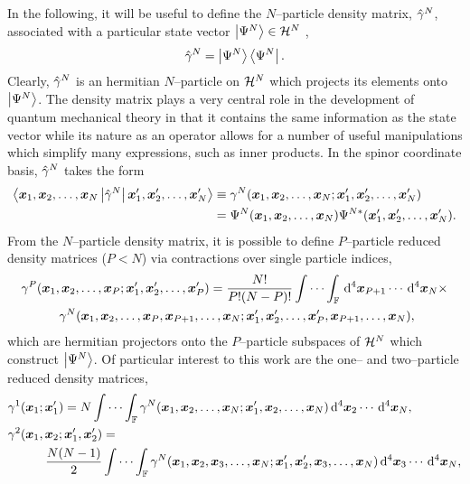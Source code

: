 In the following, it will be useful to define the $N$--particle density matrix, $\hat{\gamma}^N$,
associated with a particular state vector $\left\vert \Psi^N \right\rangle \in \mathcal{H}^N$ \cite{Yang89_book},
\begin{equation}
  \label{eq:NDenMat}
\hat{\gamma}^N = \left\vert \Psi^N \right\rangle\left\langle \Psi^N \right\vert.
\end{equation}
Clearly, $\hat{\gamma}^N$ is an hermitian $N$--particle on $\mathcal{H}^N$ which projects its elements onto $\left\vert \Psi^N \right\rangle$.
The density matrix plays a very central role in the development of quantum mechanical theory in that
it contains the same information as the state vector while its nature as an operator allows for a number
of useful manipulations which simplify many expressions, such as inner products. 
In the spinor coordinate basis, $\hat{\gamma}^N$ takes the form
\begin{align}
\label{eq:DenMatSpace}
\left\langle \boldsymbol{x}_1,\boldsymbol{x}_2,\ldots,\boldsymbol{x}_N \left\vert \hat{\gamma}^N \right\vert \boldsymbol{x}'_1,\boldsymbol{x}'_2,\ldots,\boldsymbol{x}'_N \right\rangle
  &\equiv \gamma^N(\boldsymbol{x}_1,\boldsymbol{x}_2,\ldots,\boldsymbol{x}_N; \boldsymbol{x}'_1,\boldsymbol{x}'_2,\ldots,\boldsymbol{x}'_N) \\
  &= \Psi^N(\boldsymbol{x}_1,\boldsymbol{x}_2,\ldots,\boldsymbol{x}_N)\Psi^{N*}(\boldsymbol{x}'_1,\boldsymbol{x}'_2,\ldots,\boldsymbol{x}'_N). \nonumber
\end{align}
From the $N$--particle density matrix, it is possible to define $P$--particle reduced density matrices ($P < N$)
via contractions over single particle indices,
\begin{align}
  &\gamma^P(\boldsymbol{x}_1,\boldsymbol{x}_2,\ldots,\boldsymbol{x}_P;\boldsymbol{x}'_1,\boldsymbol{x}'_2,\ldots,\boldsymbol{x}'_P) = \frac{N!}{P!(N-P)!}
    \idotsint_\mathbb{F} \,\mathrm{d}^4\boldsymbol{x}_{P+1}\cdots\,\mathrm{d}^4\boldsymbol{x}_N \times \nonumber \\
  &\qquad \quad \gamma^N(\boldsymbol{x}_1,\boldsymbol{x}_2,\ldots,\boldsymbol{x}_P,\boldsymbol{x}_{P+1},\ldots,\boldsymbol{x}_N;\boldsymbol{x}'_1,\boldsymbol{x}'_2,\ldots,\boldsymbol{x}'_P,\boldsymbol{x}_{P+1},\ldots,\boldsymbol{x}_N),
\end{align}
which are hermitian projectors onto the $P$--particle subspaces of $\mathcal{H}^N$ which construct $\left\vert \Psi^N \right\rangle$. 
Of particular interest to this work are the one-- and two--particle reduced density matrices,
\begin{align}
&\gamma^1(\boldsymbol{x}_1;\boldsymbol{x}'_1) = N \idotsint_\mathbb{F}
  \gamma^N(\boldsymbol{x}_1,\boldsymbol{x}_2,\ldots,\boldsymbol{x}_N;\boldsymbol{x}'_1,\boldsymbol{x}_2,\ldots,\boldsymbol{x}_N) \,\mathrm{d}^4\boldsymbol{x}_{2}\cdots\,\mathrm{d}^4\boldsymbol{x}_N, \\
&\gamma^2(\boldsymbol{x}_1,\boldsymbol{x}_2;\boldsymbol{x}'_1,\boldsymbol{x}'_2) =  \nonumber \\ &\qquad \quad \frac{N(N-1)}{2} \idotsint_\mathbb{F}
  \gamma^N(\boldsymbol{x}_1,\boldsymbol{x}_2,\boldsymbol{x}_3,\ldots,\boldsymbol{x}_N;\boldsymbol{x}'_1,\boldsymbol{x}'_2,\boldsymbol{x}_3,\ldots,\boldsymbol{x}_N) \,\mathrm{d}^4\boldsymbol{x}_{3}\cdots\,\mathrm{d}^4\boldsymbol{x}_N,
\end{align}
